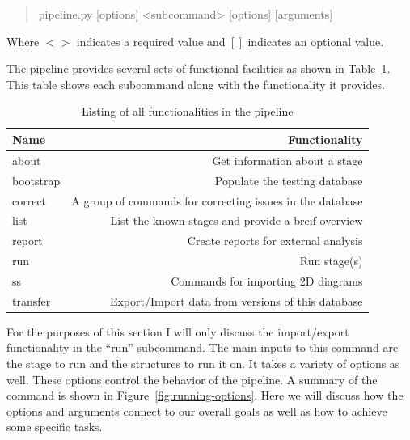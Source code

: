 \begin{quote}
pipeline.py [options] <subcommand> [options] [arguments]
\end{quote}

Where $<>$ indicates a required value and $[]$ indicates an optional
value.

The pipeline provides several sets of functional facilities as shown in
Table~\ref{tab:pipeline-functionality}. This table shows each subcommand along
with the functionality it provides.

\begin{table}[ht]
\begin{tabular}{lr}
\toprule
Name & Functionality \\
\midrule
about & Get information about a stage \\
bootstrap & Populate the testing database \\
correct & A group of commands for correcting issues in the database \\
list & List the known stages and provide a breif overview \\
report & Create reports for external analysis \\
run & Run stage(s) \\
ss & Commands for importing 2D diagrams \\
transfer & Export/Import data from versions of this database \\
\bottomrule
\end{tabular}
\caption{Listing of all functionalities in the pipeline}
\label{tab:pipeline-functionality}
\end{table}

For the purposes of this section I will only discuss the import/export
functionality in the ``run'' subcommand. The main inputs to this command are the
stage to run and the structures to run it on. It takes a variety of options as
well. These options control the behavior of the pipeline. A summary of the
command is shown in Figure~\ref{fig:running-options}. Here we will discuss how
the options and arguments connect to our overall goals as well as how to achieve
some specific tasks.


